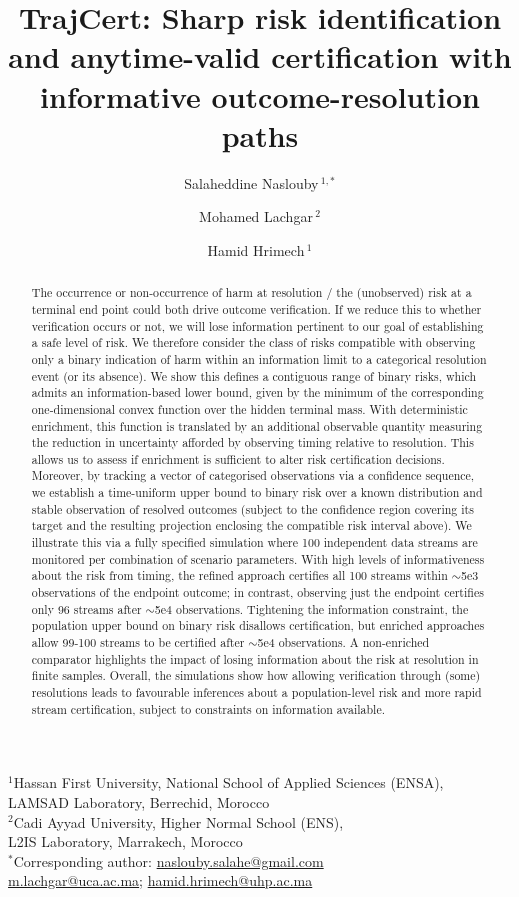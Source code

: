 \documentclass[11pt]{article}
\title{TrajCert: Sharp risk identification and anytime-valid certification with informative outcome-resolution paths}
\author{Salaheddine Naslouby\,\orcidlink{0009-0002-7295-7816}$^{1,*}$ \and Mohamed Lachgar\,\orcidlink{0000-0002-6155-3309}$^2$ \and Hamid Hrimech\,\orcidlink{0000-0002-3980-1214}$^1$}
\date{}
\begin{document}
\maketitle
\begin{center}\small
$^1$Hassan First University, National School of Applied Sciences (ENSA),\\
LAMSAD Laboratory, Berrechid, Morocco\\[3pt]
$^2$Cadi Ayyad University, Higher Normal School (ENS),\\
L2IS Laboratory, Marrakech, Morocco\\[5pt]
$^*$Corresponding author: \href{mailto:naslouby.salahe@gmail.com}{naslouby.salahe@gmail.com}\\
\href{mailto:m.lachgar@uca.ac.ma}{m.lachgar@uca.ac.ma};
\href{mailto:hamid.hrimech@uhp.ac.ma}{hamid.hrimech@uhp.ac.ma}
\end{center}
\begin{abstract}
The occurrence or non-occurrence of harm at resolution / the (unobserved) risk at a terminal end point could both drive outcome verification. If we reduce this to whether verification occurs or not, we will lose information pertinent to our goal of establishing a safe level of risk. We therefore consider the class of risks compatible with observing only a binary indication of harm within an information limit to a categorical resolution event (or its absence). We show this defines a contiguous range of binary risks, which admits an information-based lower bound, given by the minimum of the corresponding one-dimensional convex function over the hidden terminal mass. With deterministic enrichment, this function is translated by an additional observable quantity measuring the reduction in uncertainty afforded by observing timing relative to resolution. This allows us to assess if enrichment is sufficient to alter risk certification decisions. Moreover, by tracking a vector of categorised observations via a confidence sequence, we establish a time-uniform upper bound to binary risk over a known distribution and stable observation of resolved outcomes (subject to the confidence region covering its target and the resulting projection enclosing the compatible risk interval above). We illustrate this via a fully specified simulation where 100 independent data streams are monitored per combination of scenario parameters. With high levels of informativeness about the risk from timing, the refined approach certifies all 100 streams within $\sim$5e3 observations of the endpoint outcome; in contrast, observing just the endpoint certifies only 96 streams after $\sim$5e4 observations. Tightening the information constraint, the population upper bound on binary risk disallows certification, but enriched approaches allow 99-100 streams to be certified after $\sim$5e4 observations. A non-enriched comparator highlights the impact of losing information about the risk at resolution in finite samples. Overall, the simulations show how allowing verification through (some) resolutions leads to favourable inferences about a population-level risk and more rapid stream certification, subject to constraints on information available.
\end{abstract}
\end{document}
